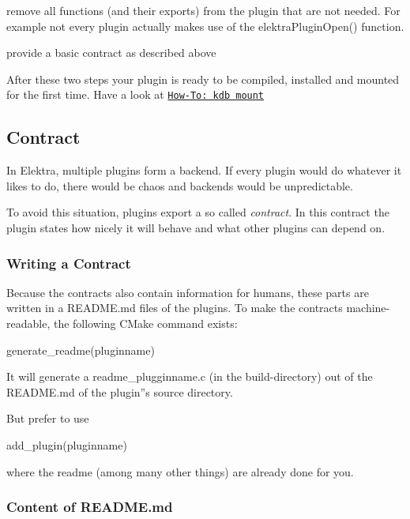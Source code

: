\begin{DoxyItemize}
\item remove all functions (and their exports) from the plugin that are not needed. For example not every plugin actually makes use of the {\ttfamily elektra\+Plugin\+Open()} function.
\item provide a basic contract as described above
\end{DoxyItemize}

After these two steps your plugin is ready to be compiled, installed and mounted for the first time. Have a look at \href{http://community.libelektra.org/wp/?p=31}{\tt How-\/\+To\+: kdb mount}

\subsection*{Contract}

In Elektra, multiple plugins form a backend. If every plugin would do whatever it likes to do, there would be chaos and backends would be unpredictable.

To avoid this situation, plugins export a so called {\itshape contract}. In this contract the plugin states how nicely it will behave and what other plugins can depend on.

\subsubsection*{Writing a Contract}

Because the contracts also contain information for humans, these parts are written in a R\+E\+A\+D\+M\+E.\+md files of the plugins. To make the contracts machine-\/readable, the following C\+Make command exists\+: \begin{DoxyVerb}    generate_readme(pluginname)
\end{DoxyVerb}


It will generate a readme\+\_\+plugginname.\+c (in the build-\/directory) out of the R\+E\+A\+D\+M\+E.\+md of the plugin''s source directory.

But prefer to use \begin{DoxyVerb}    add_plugin(pluginname)
\end{DoxyVerb}


where the readme (among many other things) are already done for you.

\subsubsection*{Content of R\+E\+A\+D\+M\+E.\+md}


